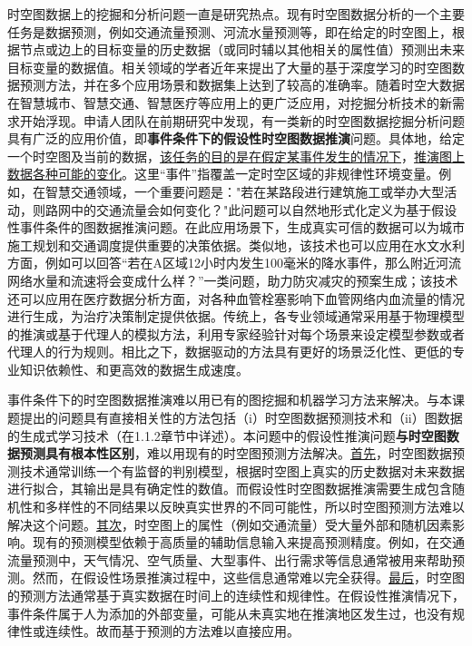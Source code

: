 \documentclass[12pt,UTF8,AutoFakeBold=2,a4paper]{ctexart} %
\begin{document}
时空图数据上的挖掘和分析问题一直是研究热点。现有时空图数据分析的一个主要任务是数据预测，例如交通流量预测、河流水量预测等，即在给定的时空图上，根据节点或边上的目标变量的历史数据（或同时辅以其他相关的属性值）预测出未来目标变量的数据值。相关领域的学者近年来提出了大量的基于深度学习的时空图数据预测方法，并在多个应用场景和数据集上达到了较高的准确率。随着时空大数据在智慧城市、智慧交通、智慧医疗等应用上的更广泛应用，对挖掘分析技术的新需求开始浮现。申请人团队在前期研究中发现，有一类新的时空图数据挖掘分析问题具有广泛的应用价值，即\textbf{事件条件下的假设性时空图数据推演}问题。具体地，给定一个时空图及当前的数据，\underline{该任务的目的是在假定某事件发生的情况下}，\underline{推演图上数据各种可能的变化}。这里``事件''指覆盖一定时空区域的非规律性环境变量。例如，在智慧交通领域，一个重要问题是："若在某路段进行建筑施工或举办大型活动，则路网中的交通流量会如何变化？"此问题可以自然地形式化定义为基于假设性事件条件的图数据推演问题。在此应用场景下，生成真实可信的数据可以为城市施工规划和交通调度提供重要的决策依据。类似地，该技术也可以应用在水文水利方面，例如可以回答“若在A区域12小时内发生100毫米的降水事件，那么附近河流网络水量和流速将会变成什么样？”一类问题，助力防灾减灾的预案生成；该技术还可以应用在医疗数据分析方面，对各种血管栓塞影响下血管网络内血流量的情况进行生成，为治疗决策制定提供依据。传统上，各专业领域通常采用基于物理模型的推演或基于代理人的模拟方法，利用专家经验针对每个场景来设定模型参数或者代理人的行为规则。相比之下，数据驱动的方法具有更好的场景泛化性、更低的专业知识依赖性、和更高效的数据生成速度。

事件条件下的时空图数据推演难以用已有的图挖掘和机器学习方法来解决。与本课题提出的问题具有直接相关性的方法包括（i）时空图数据预测技术和（ii）图数据的生成式学习技术（在1.1.2章节中详述）。本问题中的假设性推演问题\textbf{与时空图数据预测具有根本性区别}，难以用现有的时空图预测方法解决。\underline{首先}，时空图数据预测技术通常训练一个有监督的判别模型，根据时空图上真实的历史数据对未来数据进行拟合，其输出是具有确定性的数值。而假设性时空图数据推演需要生成包含随机性和多样性的不同结果以反映真实世界的不同可能性，所以时空图预测方法难以解决这个问题。\underline{其次}，时空图上的属性（例如交通流量）受大量外部和随机因素影响。现有的预测模型依赖于高质量的辅助信息输入来提高预测精度。例如，在交通流量预测中，天气情况、空气质量、大型事件、出行需求等信息通常被用来帮助预测。然而，在假设性场景推演过程中，这些信息通常难以完全获得。\underline{最后}，时空图的预测方法通常基于真实数据在时间上的连续性和规律性。在假设性推演情况下，事件条件属于人为添加的外部变量，可能从未真实地在推演地区发生过，也没有规律性或连续性。故而基于预测的方法难以直接应用。
\end{document}
